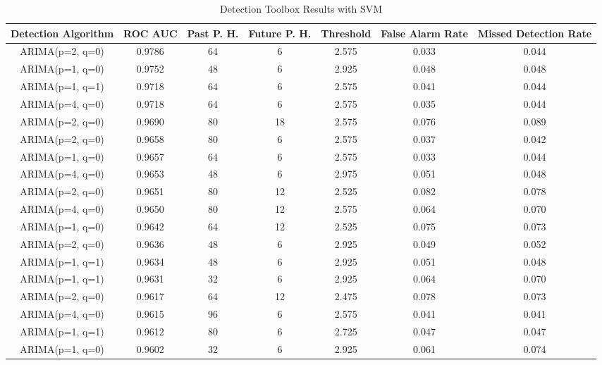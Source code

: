 \begin{table*}[h!]
\centering
\caption{Detection Toolbox Results with SVM}
    \label{table:svmexperimenttwo}
    \begin{tabular}{|c|c|c|c|c|c|c|}
        \hline
        Detection Algorithm & ROC AUC & Past P. H. & Future P. H. & Threshold & False Alarm Rate & Missed Detection Rate \\
        \hline
        \hline
        ARIMA(p=2, q=0) & 0.9786 & 64 & 6 & 2.575 &  0.033 & 0.044 \\
        \hline
        ARIMA(p=1, q=0) & 0.9752 & 48 & 6 & 2.925 &  0.048 & 0.048 \\
        \hline
        ARIMA(p=1, q=1) & 0.9718 & 64 & 6 & 2.575 &  0.041 & 0.044 \\
        \hline
        ARIMA(p=4, q=0) & 0.9718 & 64 & 6 & 2.575 &  0.035 & 0.044 \\
        \hline
        ARIMA(p=2, q=0) & 0.9690 & 80 & 18 & 2.575 &  0.076 & 0.089 \\
        \hline
        ARIMA(p=2, q=0) & 0.9658 & 80 & 6 & 2.575 &  0.037 & 0.042 \\
        \hline
        ARIMA(p=1, q=0) & 0.9657 & 64 & 6 & 2.575 &  0.033 & 0.044 \\
        \hline
        ARIMA(p=4, q=0) & 0.9653 & 48 & 6 & 2.975 &  0.051 & 0.048 \\
        \hline
        ARIMA(p=2, q=0) & 0.9651 & 80 & 12 & 2.525 &  0.082 & 0.078 \\
        \hline
        ARIMA(p=4, q=0) & 0.9650 & 80 & 12 & 2.575 &  0.064 & 0.070 \\
        \hline
        ARIMA(p=1, q=0) & 0.9642 & 64 & 12 & 2.525 &  0.075 & 0.073 \\
        \hline
        ARIMA(p=2, q=0) & 0.9636 & 48 & 6 & 2.925 &  0.049 & 0.052 \\
        \hline
        ARIMA(p=1, q=1) & 0.9634 & 48 & 6 & 2.925 &  0.051 & 0.048 \\
        \hline
        ARIMA(p=1, q=1) & 0.9631 & 32 & 6 & 2.925 &  0.064 & 0.070 \\
        \hline
        ARIMA(p=2, q=0) & 0.9617 & 64 & 12 & 2.475 &  0.078 & 0.073 \\
        \hline
        ARIMA(p=4, q=0) & 0.9615 & 96 & 6 & 2.575 &  0.041 & 0.041 \\
        \hline
        ARIMA(p=1, q=1) & 0.9612 & 80 & 6 & 2.725 &  0.047 & 0.047 \\
        \hline
        ARIMA(p=1, q=0) & 0.9602 & 32 & 6 & 2.925 &  0.061 & 0.074 \\

\end{tabular}
\end{table*}
